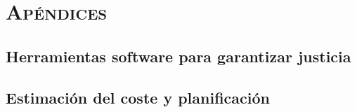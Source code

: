 \documentclass[oneside,openright,titlepage,numbers=noenddot,openany,headinclude,footinclude=true,
cleardoublepage=empty,abstractoff,BCOR=5mm,paper=a4,fontsize=12pt,main=spanish]{scrreprt}
\begin{document}
\ctparttext{\color{black}\begin{center}
\end{center}}
\part*{\textsc{Apéndices}}

\appendix
\chapter{Herramientas software para garantizar justicia}\label{ap:herr_just}


\chapter{Estimación del coste y planificación}\label{ap:coste_plan}









\end{document}
